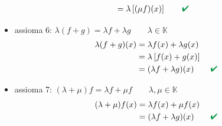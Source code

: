\documentclass[italian]{article}
\renewcommand{\checkmark}{\textcolor{ForestGreen}{\text{$\qquad$\ding{52}}}}
\newcommand{\ins}[1]{\text{$\mathbb{#1}$}}
\begin{document}
\begin{itemize}
\begin{gather*}
\begin{split}
					&= \lambda \left[ (\mu f)(x) \right] \checkmark
				\end{split}
			\end{gather*}
		\item assioma 6: $ \lambda(f+g) = \lambda f + \lambda g \qquad \lambda \in \ins{K}$
			\begin{gather*}
				\begin{split}
					\lambda(f+g)(x) &= \lambda f(x) + \lambda g(x) \\
					&= \lambda \left[ f(x) + g(x) \right] \\
					&= (\lambda f + \lambda g)(x) \checkmark
				\end{split}
			\end{gather*}
		\item assioma 7: $ (\lambda + \mu)f = \lambda f + \mu f\qquad \lambda,\mu \in \ins{K}$
			\begin{gather*}
				\begin{split}
					(\lambda + \mu)f(x) &= \lambda f(x) + \mu f(x) \\
					&= (\lambda f + \lambda g)(x) \checkmark
				\end{split}
			\end{gather*}
\end{itemize}

\newpage
\end{document}
